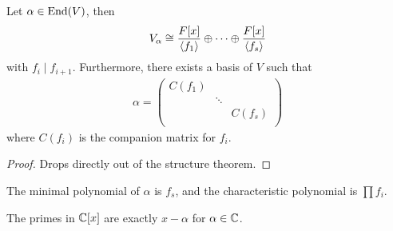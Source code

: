 \documentclass{../../template/note}
\begin{document}
    \begin{theorem}
        Let $\alpha \in \operatorname{End}(V)$, then
        \begin{align*}
            V_\alpha \cong \frac{F[x]}{\left \langle f_1 \right \rangle} \oplus \dots \oplus \frac{F[x]}{\left \langle f_s \right \rangle}
        \end{align*}
        with $f_i \mid f_{i+1}$. Furthermore, there exists a basis of $V$ such that
        \begin{align*}
            \alpha = \begin{pmatrix}
                C(f_1) &  &  \\
                 & \ddots &  \\
                 &  & C(f_s) \\
            \end{pmatrix}
        \end{align*}
        where $C(f_i)$ is the companion matrix for $f_i$.
    \end{theorem}
    
    \begin{proof}
        Drops directly out of the structure theorem.
    \end{proof}
    
    \begin{remark*}
        The minimal polynomial of $\alpha$ is $f_s$, and the characteristic polynomial is $\prod f_i$.
    \end{remark*}
    
    \begin{lemma}
        The primes in $\mathbb C[x]$ are exactly $x-\alpha$ for $\alpha \in \mathbb C$.
    \end{lemma}
    
\end{document}

